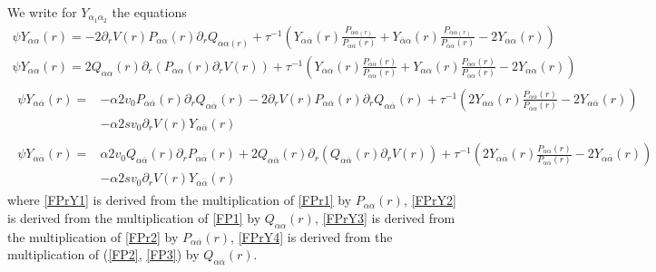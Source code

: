 \documentclass[pre,aps,superscriptaddress,nofootinbib]{revtex4}
\begin{document}
We write for $Y_{\alpha_1\alpha_2}$ the equations
\begin{eqnarray}
\label{FPrY1}
\psi Y_{\alpha\alpha}(r) = - 2 \partial_r V(r) P_{\alpha\alpha}(r) \partial_r Q_{\alpha\alpha(r)} + \tau^{-1} \left(Y_{\alpha\overline{\alpha}}(r) \frac{P_{\alpha\alpha(r)}}{P_{\alpha\overline{\alpha}}(r)} + Y_{\overline{\alpha}\alpha}(r) \frac{P_{\alpha\alpha(r)}}{P_{\overline{\alpha}\alpha}(r)} - 2 Y_{\alpha\alpha}(r)\right)\\
\label{FPrY2}
\psi Y_{\alpha\alpha}(r) = 2 Q_{\alpha\alpha}(r) \partial_r (P_{\alpha\alpha}(r) \partial_r V(r)) + \tau^{-1} \left(Y_{\alpha\alpha}(r) \frac{P_{\alpha\overline{\alpha}}(r)}{P_{\alpha\alpha}(r)} + Y_{\alpha\alpha}(r) \frac{P_{\overline{\alpha}\alpha}(r)}{P_{\alpha\alpha}(r)} - 2 Y_{\alpha\alpha}(r)\right)\\
\label{FPrY3}
\begin{aligned}
\psi Y_{\alpha\overline{\alpha}}(r) = &- \alpha 2 v_0 P_{\alpha\overline{\alpha}}(r) \partial_r Q_{\alpha\overline{\alpha}}(r) - 2 \partial_r V(r) P_{\alpha\overline{\alpha}}(r) \partial_r Q_{\alpha\overline{\alpha}}(r) + \tau^{-1} \left(2 Y_{\alpha\alpha}(r) \frac{P_{\alpha\overline{\alpha}}(r)}{P_{\alpha\alpha}(r)} - 2 Y_{\alpha\overline{\alpha}}(r)\right)\\
&- \alpha 2 s v_0 \partial_r V(r) Y_{\alpha\overline{\alpha}}(r)
\end{aligned}\\
\label{FPrY4}
\begin{aligned}
\psi Y_{\alpha\overline{\alpha}}(r) = &\alpha 2 v_0 Q_{\alpha\overline{\alpha}}(r) \partial_r P_{\alpha\overline{\alpha}}(r) + 2 Q_{\alpha\overline{\alpha}}(r) \partial_r (Q_{\alpha\overline{\alpha}}(r) \partial_r V(r)) + \tau^{-1} \left(2 Y_{\alpha\overline{\alpha}}(r) \frac{P_{\alpha\alpha}(r)}{P_{\alpha\overline{\alpha}}(r)} - 2 Y_{\alpha\overline{\alpha}}(r)\right)\\
&- \alpha 2 s v_0 \partial_r V(r) Y_{\alpha\overline{\alpha}}(r)
\end{aligned}
\end{eqnarray}
where \eqref{FPrY1} is derived from the multiplication of \eqref{FPr1} by $P_{\alpha\alpha}(r)$, \eqref{FPrY2} is derived from the multiplication of \eqref{FP1} by $Q_{\alpha\alpha}(r)$, \eqref{FPrY3} is derived from the multiplication of \eqref{FPr2} by $P_{\alpha\overline{\alpha}}(r)$, \eqref{FPrY4} is derived from the multiplication of (\ref{FP2}, \ref{FP3}) by $Q_{\alpha\overline{\alpha}}(r)$.\\
\end{document}
